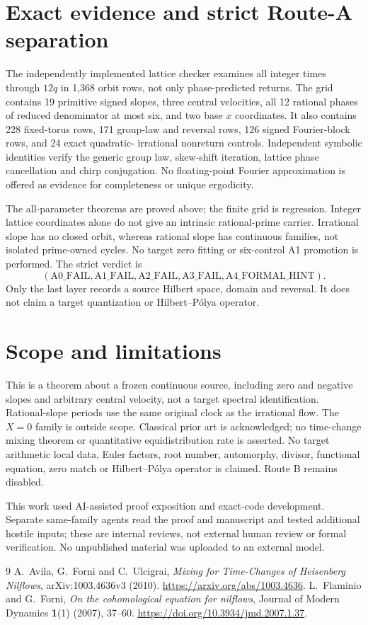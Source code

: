 \documentclass[10pt]{article}
\begin{document}
\section{Exact evidence and strict Route-A separation}
The independently implemented lattice checker examines all integer times
through $12q$ in 1,368 orbit rows, not only phase-predicted returns.
The grid contains 19 primitive signed slopes, three central velocities,
all 12 rational phases of reduced denominator at most six, and two base
$x$ coordinates. It also contains 228 fixed-torus rows, 171 group-law and
reversal rows, 126 signed Fourier-block rows, and 24 exact quadratic-
irrational nonreturn controls. Independent symbolic identities verify
the generic group law, skew-shift iteration, lattice phase cancellation
and chirp conjugation. No floating-point Fourier approximation is offered
as evidence for completeness or unique ergodicity.

The all-parameter theorems are proved above; the finite grid is regression.
Integer lattice coordinates alone do not give an intrinsic rational-prime
carrier. Irrational slope has no closed orbit, whereas rational slope has
continuous families, not isolated prime-owned cycles. No target zero
fitting or six-control A1 promotion is performed. The strict verdict is
\[
 (\mathrm{A0\_FAIL},\mathrm{A1\_FAIL},\mathrm{A2\_FAIL},
   \mathrm{A3\_FAIL},\mathrm{A4\_FORMAL\_HINT}).
\]
Only the last layer records a source Hilbert space, domain and reversal.
It does not claim a target quantization or Hilbert--P\'olya operator.
\fi

\section{Scope and limitations}
This is a theorem about a frozen continuous source, including zero and
negative slopes and arbitrary central velocity, not a target spectral
identification. Rational-slope periods use the same original clock as
the irrational flow. The $X=0$ family is outside scope. Classical prior
art is acknowledged; no time-change mixing theorem or quantitative
equidistribution rate is asserted. No target arithmetic local data,
Euler factors, root number, automorphy, divisor, functional equation,
zero match or Hilbert--P\'olya operator is claimed.
Route B remains disabled.

This work used AI-assisted proof exposition and exact-code development.
Separate same-family agents read the proof and manuscript and tested
additional hostile inputs; these are internal reviews, not external
human review or formal verification. No unpublished material was uploaded
to an external model.

\begin{thebibliography}{9}
A.~Avila, G.~Forni and C.~Ulcigrai,
\emph{Mixing for Time-Changes of Heisenberg Nilflows},
arXiv:1003.4636v3 (2010).
\url{https://arxiv.org/abs/1003.4636}.
L.~Flaminio and G.~Forni,
\emph{On the cohomological equation for nilflows},
Journal of Modern Dynamics \textbf{1}(1) (2007), 37--60.
\url{https://doi.org/10.3934/jmd.2007.1.37}.
\end{thebibliography}
\end{document}
